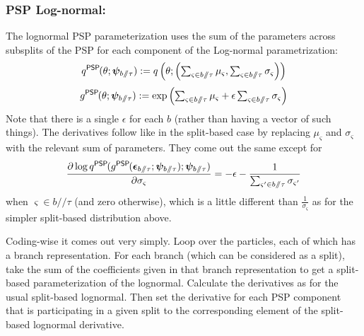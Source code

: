 \documentclass{article}
\newcommand{\psp}{\slash\!\!\slash}
\newcommand{\qPSP}{q^\textsf{PSP}\hspace{-1pt}}
\newcommand{\gPSP}{g^\textsf{PSP}\hspace{-1pt}}
\begin{document}
\subsubsection*{PSP Log-normal:}

The lognormal PSP parameterization uses the sum of the parameters across subsplits of the PSP for each component of the Log-normal parametrization:
\[
\qPSP(\theta; \bm\psi_{b \psp \tau}) :=
q\left(\theta; \left(
        \textstyle\sum_{\varsigma \in b \psp \tau} \mu_\varsigma,
        \textstyle\sum_{\varsigma \in b \psp \tau} \sigma_\varsigma
    \right)\right)
\]
\[
\gPSP(\theta; \bm\psi_{b \psp \tau}) :=
    \exp \left(
        \textstyle\sum_{\varsigma \in b \psp \tau} \mu_\varsigma +
        \epsilon
        \textstyle\sum_{\varsigma \in b \psp \tau} \sigma_\varsigma
    \right)
\]
Note that there is a single $\epsilon$ for each $b$ (rather than having a vector of such things).
The derivatives follow like in the split-based case by replacing $\mu_\varsigma$ and $\sigma_\varsigma$ with the relevant sum of parameters.
They come out the same except for
\[
    \frac
    {\partial \log \qPSP(\gPSP(\bm\epsilon_{b \psp \tau}; \bm\psi_{b \psp \tau}); \bm\psi_{b \psp \tau})}
    {\partial \sigma_{\varsigma}}
    =
    - \epsilon
    - \frac{1}{\textstyle\sum_{\varsigma' \in b \psp \tau} \sigma_{\varsigma'}}
\]
when $\varsigma \in b \psp \tau$ (and zero otherwise), which is a little different than $\frac{1}{\sigma_\varsigma}$ as for the simpler split-based distribution above.

Coding-wise it comes out very simply.
Loop over the particles, each of which has a branch representation.
For each branch (which can be considered as a split), take the sum of the coefficients given in that branch representation to get a split-based parameterization of the lognormal.
Calculate the derivatives as for the usual split-based lognormal.
Then set the derivative for each PSP component that is participating in a given split to the corresponding element of the split-based lognormal derivative.


\nocite{vbpi}



\end{document}
